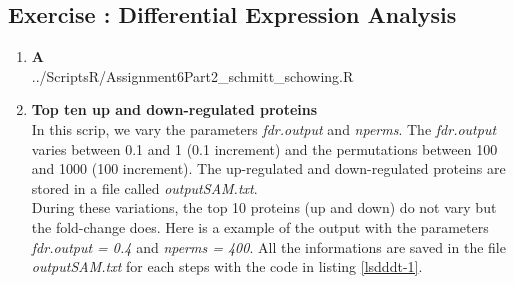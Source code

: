 \documentclass[10pt,a4paper]{article}
\newcommand{\exercise}[1]
{
  \stepcounter{subsection}
  \subsection*{Exercise \thesubsection: #1}

}
\begin{document}
\newpage
\exercise{Differential Expression Analysis}
\begin{enumerate}
	
	\item \textbf{A}\\

		 {../ScriptsR/Assignment6Part2\string_schmitt\string_schowing.R}
	
	\item \textbf{Top ten up and down-regulated proteins}\\
	In this scrip, we vary the parameters \textit{fdr.output} and \textit{nperms}. The \textit{fdr.output} varies between 0.1 and 1 (0.1 increment) and the permutations between 100 and 1000 (100 increment). The up-regulated and down-regulated proteins are stored in a file called \textit{outputSAM.txt}.\\
	During these variations, the top 10 proteins (up and down) do not vary but the fold-change does. Here is a example of the output with the parameters \textit{fdr.output = 0.4} and \textit{nperms = 400}. All the informations are saved in the file \textit{outputSAM.txt} for each steps with the code in listing \ref{lsdddt-1}.
	

\end{enumerate}
\end{document}
